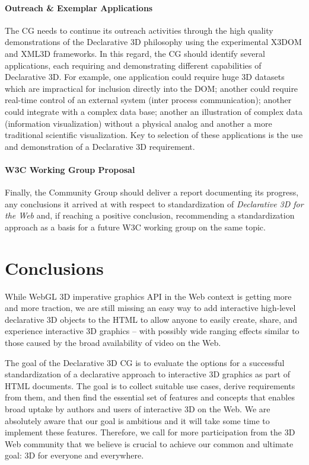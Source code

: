 \documentclass[review]{acmsiggraph}
\begin{document}
\paragraph{Outreach \& Exemplar Applications}
The CG needs to continue its outreach activities through the high quality demonstrations of the Declarative 3D philosophy using the experimental X3DOM and XML3D frameworks. %
In this regard, the CG should identify several applications, each requiring and demonstrating different capabilities of Declarative 3D. For example, one application could require huge 3D datasets which are impractical for inclusion directly into the DOM; another could require real-time control of an external system (inter process communication); another could integrate with a complex data base; another an illustration of complex data (information visualization) without a physical analog and another a more traditional scientific visualization. Key to selection of these applications is the use and demonstration of a Declarative 3D requirement.

\paragraph{W3C Working Group Proposal}
Finally, the Community Group should deliver a report documenting its progress, any conclusions it arrived at with respect to standardization of \textit{Declarative 3D for the Web} and, if reaching a positive conclusion, recommending a standardization approach as a basis for a future W3C working group on the same topic.



\section{Conclusions}

\label{sec:Conclusions}
While WebGL 3D imperative graphics API in the Web context is getting more and more traction, we are still missing an easy way to add interactive high-level declarative 3D objects to the HTML to allow anyone to easily create, share, and experience interactive 3D graphics – with possibly wide ranging effects similar to those caused by the broad availability of video on the Web.

The goal of the Declarative 3D CG is to evaluate the options for a successful standardization of a declarative approach to interactive 3D graphics as part of HTML documents. The goal is to collect suitable use cases, derive requirements from them, and then find the essential set of features and concepts that enables broad uptake by authors and users of interactive 3D on the Web.
We are absolutely aware that our goal is ambitious and it will take some time to implement these features. Therefore, we call for more participation from the 3D Web community that we believe is crucial to achieve our common and ultimate goal: 3D for everyone and everywhere.




\end{document}
